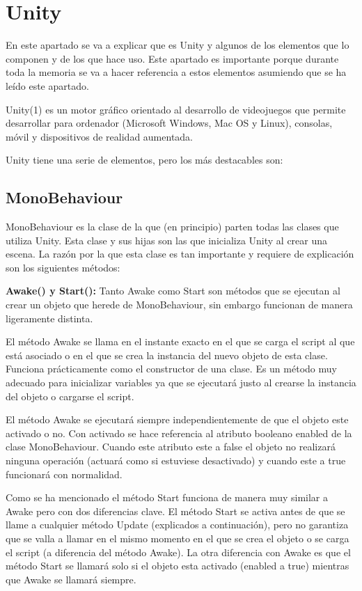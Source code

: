
\section{Unity \cite{Unity}}
En este apartado se va a explicar que es Unity y algunos de los elementos que lo componen y de los que hace uso. Este apartado es importante porque durante toda la memoria se va a hacer referencia a estos elementos asumiendo que se ha leído este apartado.

Unity(1) es un motor gráfico orientado al desarrollo de videojuegos que permite desarrollar para ordenador (Microsoft Windows, Mac OS y Linux), consolas, móvil y dispositivos de realidad aumentada.

Unity tiene una serie de elementos, pero los más destacables son:

\subsection{MonoBehaviour \cite{ClaseMonobehaviour}}
MonoBehaviour es la clase de la que (en principio) parten todas las clases que utiliza Unity. Esta clase y sus hijas son las que inicializa Unity al crear una escena. La razón por la que esta clase es tan importante y requiere de explicación son los siguientes métodos:

\textbf{Awake() y Start():} Tanto Awake como Start son métodos que se ejecutan al crear un objeto que herede de MonoBehaviour, sin embargo funcionan de manera ligeramente distinta. 

El método Awake se llama en el instante exacto en el que se carga el script al que está asociado o en el que se crea la instancia del nuevo objeto de esta clase. Funciona prácticamente como el constructor de una clase. Es un método muy adecuado para inicializar variables ya que se ejecutará justo al crearse la instancia del objeto o cargarse el script. 

El método Awake se ejecutará siempre independientemente de que el objeto este activado o no. Con activado se hace referencia al atributo booleano enabled de la clase MonoBehaviour. Cuando este atributo este a false el objeto no realizará ninguna operación (actuará como si estuviese desactivado) y cuando este a true funcionará con normalidad.

Como se ha mencionado el método Start funciona de manera muy similar a Awake pero con dos diferencias clave. El método Start se activa antes de que se llame a cualquier método Update (explicados a continuación), pero no garantiza que se valla a llamar en el mismo momento en el que se crea el objeto o se carga el script (a diferencia del método Awake). La otra diferencia con Awake es que el método Start se llamará solo si el objeto esta activado (enabled a true) mientras que Awake se llamará siempre.\\



